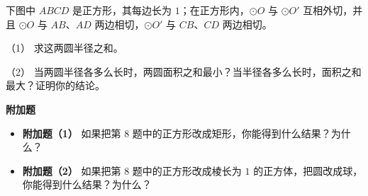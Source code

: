 \begin{question}
下图中 $ABCD$ 是正方形，其每边长为 $1$；在正方形内，$\odot O$ 与 $\odot O'$ 互相外切，并且 $\odot O$ 与 $AB$、$AD$ 两边相切，$\odot O'$ 与 $CB$、$CD$ 两边相切。
\nopagebreak[4]
\begin{center}\end{center}
\nopagebreak[4]
（1） 求这两圆半径之和。

（2） 当两圆半径各多么长时，两圆面积之和最小？当半径各多么长时，面积之和最大？证明你的结论。

\Needspace{0.25\textheight}
\textbf{附加题}

\begin{itemize}
\item \textbf{附加题（1）} 如果把第 8 题中的正方形改成矩形，你能得到什么结果？为什么？
\end{itemize}

\begin{itemize}
\item \textbf{附加题（2）} 如果把第 8 题中的正方形改成棱长为 $1$ 的正方体，把圆改成球，你能得到什么结果？为什么？
\end{itemize}

\end{question}